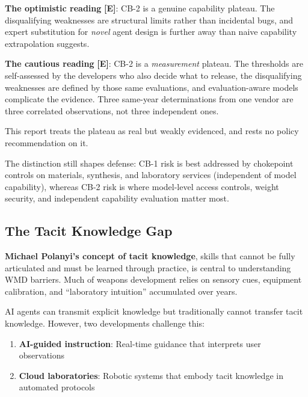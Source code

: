\documentclass[11pt,letterpaper]{article}
\begin{document}
\begin{barrierbox}
\textbf{The optimistic reading} \textbf{[E]}: CB-2 is a genuine capability plateau. The disqualifying weaknesses are structural limits rather than incidental bugs, and expert substitution for \textit{novel} agent design is further away than naive capability extrapolation suggests.

\vspace{0.4em}
\textbf{The cautious reading} \textbf{[E]}: CB-2 is a \textit{measurement} plateau. The thresholds are self-assessed by the developers who also decide what to release, the disqualifying weaknesses are defined by those same evaluations, and evaluation-aware models complicate the evidence. Three same-year determinations from one vendor are three correlated observations, not three independent ones.

\vspace{0.4em}
This report treats the plateau as real but weakly evidenced, and rests no policy recommendation on it.
\end{barrierbox}

The distinction still shapes defense: CB-1 risk is best addressed by chokepoint controls on materials, synthesis, and laboratory services (independent of model capability), whereas CB-2 risk is where model-level access controls, weight security, and independent capability evaluation matter most.

\subsection{The Tacit Knowledge Gap}

\textbf{Michael Polanyi's concept of tacit knowledge}, skills that cannot be fully articulated and must be learned through practice, is central to understanding WMD barriers. Much of weapons development relies on sensory cues, equipment calibration, and ``laboratory intuition'' accumulated over years.

AI agents can transmit explicit knowledge but traditionally cannot transfer tacit knowledge. However, two developments challenge this:
\begin{enumerate}
  \item \textbf{AI-guided instruction}: Real-time guidance that interprets user observations
  \item \textbf{Cloud laboratories}: Robotic systems that embody tacit knowledge in automated protocols
\end{enumerate}
\end{document}

